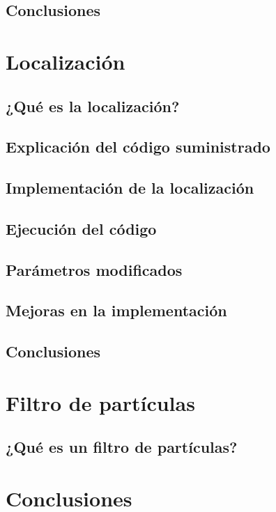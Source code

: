 \documentclass[11pt]{report}
\begin{document}
\section{Conclusiones}

\chapter{Localización}

\section{¿Qué es la localización?}

\section{Explicación del código suministrado}

\section{Implementación de la localización}

\section{Ejecución del código}

\section{Parámetros modificados}

\section{Mejoras en la implementación}

\section{Conclusiones}

\chapter{Filtro de partículas}

\section{¿Qué es un filtro de partículas?}

\chapter{Conclusiones}
\end{document}
